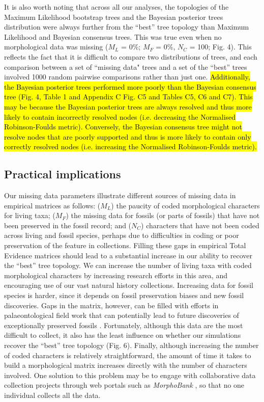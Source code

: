\documentclass[12pt,letterpaper]{article}
\begin{document}
It is also worth noting that across all our analyses, the topologies of the Maximum Likelihood bootstrap trees and the Bayesian posterior trees distribution were always further from the ``best'' tree topology than Maximum Likelihood and Bayesian consensus trees.
This was true even when no morphological data was missing ($M_{L}$ = 0\%; $M_{F}$ = 0\%, $N_{C}$ = 100; Fig. 4).
This reflects the fact that it is difficult to compare two distributions of trees, and each comparison between a set of ``missing data" trees and a set of the ``best'' trees involved 1000 random pairwise comparisons rather than just one.
\hl{Additionally, the Bayesian posterior trees performed more poorly than the Bayesian consensus tree (Fig. 4, Table 1 and Appendix C Fig. C5 and Tables C5, C6 and C7).
This may be because the Bayesian posterior trees are always resolved and thus more likely to contain incorrectly resolved nodes (i.e. decreasing the Normalised Robinson-Foulds metric).
Conversely, the Bayesian consensus tree might not resolve nodes that are poorly supported and thus is more likely to contain only correctly resolved nodes (i.e. increasing the Normalised Robinson-Foulds metric).}


\subsection{Practical implications}
Our missing data parameters illustrate different sources of missing data in empirical matrices as follows: ($M_{L}$) the paucity of coded morphological characters for living taxa; ($M_{F}$) the missing data for fossils (or parts of fossils) that have not been preserved in the fossil record; and ($N_{C}$) characters that have not been coded across living and fossil species, perhaps due to difficulties in coding or poor preservation of the feature in collections.
Filling these gaps in empirical Total Evidence matrices should lead to a substantial increase in our ability to recover the ``best'' tree topology.
We can increase the number of living taxa with coded morphological characters by increasing research efforts in this area, and encouraging use of our vast natural history collections.
Increasing data for fossil species is harder, since it depends on fossil preservation biases and new fossil discoveries.
Gaps in the matrix, however, can be filled with efforts in palaeontological field work that can potentially lead to future discoveries of exceptionally preserved fossils \citep[e.g.][]{nithe2013}.
Fortunately, although this data are the most difficult to collect, it also has the least influence on whether our simulations recover the ``best'' tree topology (Fig. 6).
Finally, although increasing the number of coded characters is relatively straightforward, the amount of time it takes to build a morphological matrix increases directly with the number of characters involved.
One solution to this problem may be to engage with collaborative data collection projects through web portals such as \textit{MorphoBank} \citep{morphobank}, so that no one individual collects all the data.
\end{document}

